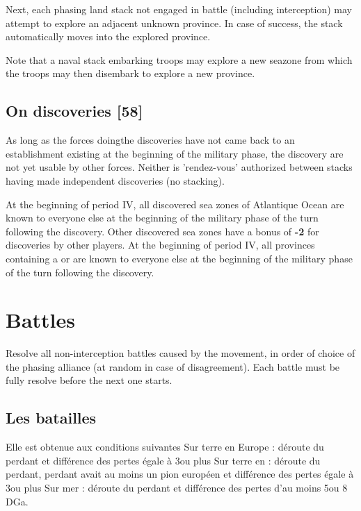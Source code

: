 Next, each phasing land stack not engaged in battle (including interception)
may attempt to explore an adjacent unknown province. In case of success, the
stack automatically moves into the explored province.

Note that a naval stack embarking troops may explore a new seazone from which
the troops may then disembark to explore a new province.

\iamhere

\subsection{On discoveries [58]}
\aparag As long as the forces doingthe discoveries have not came back to an
establishment existing at the beginning of the military phase, the discovery
are not yet usable by other forces.  Neither is 'rendez-vous' authorized
between stacks having made independent discoveries (no stacking).

\bparag[On sea] At the beginning of period IV, all discovered sea zones of
Atlantique Ocean are known to everyone else at the beginning of the military
phase of the turn following the discovery. Other discovered sea zones have a
bonus of {\bf -2} for discoveries by other players.
\bparag [On land] At the beginning of period IV, all provinces containing a
\COL or \TP are known to everyone else at the beginning of the military phase
of the turn following the discovery.


\section{Battles}
Resolve all non-interception battles caused by the movement, in order of
choice of the phasing alliance (at random in case of disagreement). Each
battle must be fully resolve before the next one starts.

\subsection{Les batailles}
Elle est obtenue aux conditions suivantes
\bparag Sur terre en Europe : déroute du perdant et différence des
pertes égale à 3\LD ou plus
\bparag Sur terre en \ROTW : déroute du perdant, perdant avait au moins
un pion \ARMY européen et différence des pertes égale à 3\LD ou plus
\bparag Sur mer : déroute du perdant et différence des pertes
d'au moins 5\ND ou 8 DGa.

